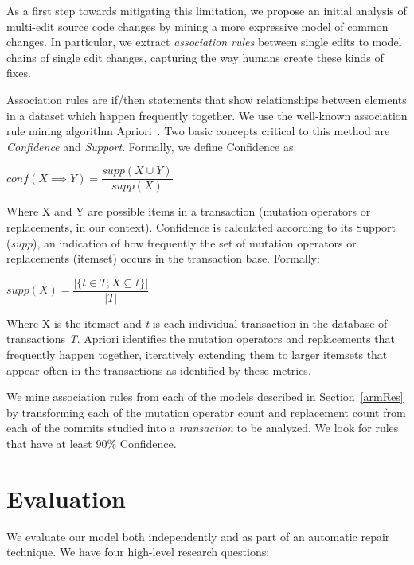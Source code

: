 \documentclass[conference]{IEEEtran}
\begin{document}
As a first step towards mitigating this limitation, we propose 
an initial analysis of multi-edit 
source code changes by mining a more expressive model of common changes. In
particular, we extract \emph{association rules} between single edits 
to model chains of single edit changes, capturing the way humans create these kinds of fixes.

Association rules are if/then statements that show relationships between elements in a dataset which happen frequently together. We use the 
well-known association rule mining algorithm
Apriori~\cite{Agrawal94}. 
%
Two basic concepts critical to this method are \emph{Confidence} and \emph{Support}.
Formally, we define Confidence as:

\begin{center}
$conf(X \implies Y) = \dfrac{supp(X \cup Y)}{supp(X)}$ 
\end{center}

Where X and Y are possible items in a transaction (mutation operators or replacements, in our
context). Confidence is calculated according to its Support (\emph{supp}), 
an indication of how frequently the set of mutation operators or replacements (itemset) 
 occurs in the transaction base.
Formally:

\begin{center}
$supp(X) = \dfrac{|\{t \in T; X \subseteq t\}|}{|T|}$
\end{center}

Where X is the itemset and \emph{t} is each individual transaction in
the database of transactions \emph{T}. Apriori identifies the mutation
operators and replacements that frequently happen together, iteratively extending them to larger
itemsets that appear often in the transactions as identified by these metrics.

We mine association rules from each of the models described in Section~\ref{armRes} by transforming each of the mutation operator count and replacement count from 
each of the commits studied into a \emph{transaction} to be analyzed. 
We look for rules that have at least 90\% Confidence.


\section{Evaluation} \label{evaluation}

We evaluate our model both independently and as part of an automatic repair
technique.  We have four high-level research questions:
\end{document}
